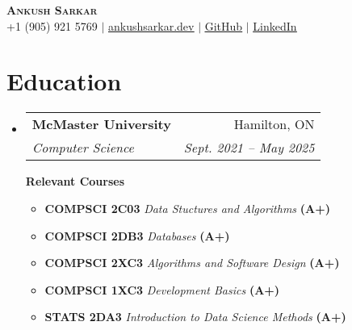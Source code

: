 \documentclass[a4paper,10pt]{article}
\makeatletter
\newcommand{\resumeSubheading}[4]{
  \vspace{-1pt}\item
    \begin{tabular*}{0.97\textwidth}[t]{l@{\extracolsep{\fill}}r}
      \textbf{#1} & #2 \\
      \textit{\normalsize#3} & \textit{\normalsize #4} \\
    \end{tabular*}\vspace{-7pt}
}
\newcommand{\resumeSubHeadingListStart}{\begin{itemize}[leftmargin=0.15in, label={}]}
\newcommand{\resumeSubHeadingListEnd}{\end{itemize}}
\makeatother
\begin{document}

\begin{center}
  \textbf{\Huge \scshape Ankush Sarkar} \\ \vspace{1pt}
  \small +1 (905) 921 5769 $|$ \href{https://www.ankushsarkar.dev/}{\underline{ankushsarkar.dev}} $|$
  \href{https://github.com/AnkushSarkar10}{\underline{GitHub}} $|$
  \href{https://www.linkedin.com/in/ankush-sarkar-a55a5b213/}{\underline{LinkedIn}}
\end{center}


\section{Education}
\resumeSubHeadingListStart
\resumeSubheading
{McMaster University}{Hamilton, ON}
{Computer Science}{Sept. 2021 -- May 2025}

\vspace{7pt}
\textbf{Relevant Courses}
\vspace{-5pt}
\begin{itemize}[leftmargin=0.15in, label={}]
  \item  \vspace{-1pt}  \textbf{COMPSCI 2C03} \textit{Data Stuctures and Algorithms}  \textbf{(A+)}
  \item  \vspace{-1pt}  \textbf{COMPSCI 2DB3} \textit{Databases}  \textbf{(A+)}
  \item  \vspace{-1pt}  \textbf{COMPSCI 2XC3} \textit{Algorithms and Software Design}  \textbf{(A+)}
  \item  \vspace{-1pt}  \textbf{COMPSCI 1XC3} \textit{Development Basics}  \textbf{(A+)}
  \item  \vspace{-1pt}  \textbf{STATS 2DA3} \textit{Introduction to Data Science Methods}  \textbf{(A+)}
\end{itemize}
\vspace{-10pt}
\resumeSubHeadingListEnd
\end{document}
